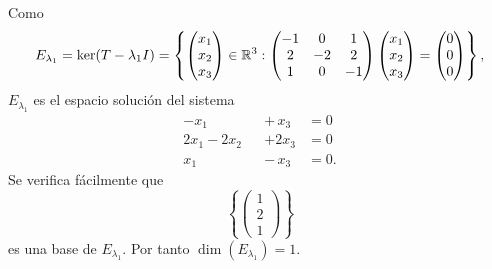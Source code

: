 \documentclass[12pt,a4paper]{book}
\begin{document}
\begin{ejemplo}
        Como
        \begin{equation*}
            E_{\lambda_1}=\ker(T-\lambda_1 I)=\left\{\begin{pmatrix}x_1\\x_2\\x_3\end{pmatrix}\in\mathbb{R}^3: \begin{pmatrix}-1&0&1\\2&-2&2\\1&0&-1\end{pmatrix}\begin{pmatrix}x_1\\x_2\\x_3\end{pmatrix}=\begin{pmatrix}0\\0\\0\end{pmatrix}\right\},
        \end{equation*}
        $E_{\lambda_1}$ es el espacio solución del sistema
        \begin{align*}
            -x_1&&+\,x_3&=0\\
            2x_1-2x_2&&+2x_3&=0\\
            x_1&&-\,x_3&=0.
        \end{align*}
        Se verifica fácilmente que
        \begin{equation*}
            \left\{\begin{pmatrix}1\\2\\1\end{pmatrix}\right\}
        \end{equation*}
        es una base de $E_{\lambda_1}$. Por tanto $\dim(E_{\lambda_1})=1$.


\end{ejemplo}
\end{document}
